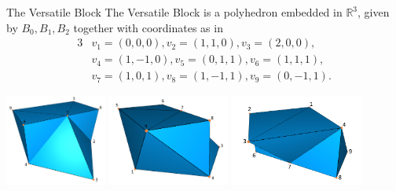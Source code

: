 \documentclass{beamer}
\numberwithin{equation}{aufgabe}
\newcommand\R{\mathbb R}
\begin{document}
\begin{frame}{The Versatile Block}
    The Versatile Block is a polyhedron embedded in $\R^3$, given by $B_0, B_1, B_2$ together with coordinates as in \cite{bridges23}
    \begin{alignat*}{3}
    &v_1 = (0, 0, 0) , v_2 = (1, 1, 0) ,  v_3 = (2, 0, 0) , \\
    &v_4 = (1, -1, 0) , v_5 = (0, 1, 1) ,  v_6 = (1, 1, 1) ,  \\
    &v_7 = (1, 0, 1) , v_8 = (1, -1, 1) , v_9 = (0, -1, 1).
    \end{alignat*} 
    \pause
    \begin{center}    
        \includegraphics[width=0.25\textwidth]{images/versatile-front.png}
        \includegraphics[width=0.3\textwidth]{images/versatile-back.png}
        \includegraphics[width=0.33\textwidth]{images/versatile-square.png}
    \end{center}
\end{frame}
\end{document}
